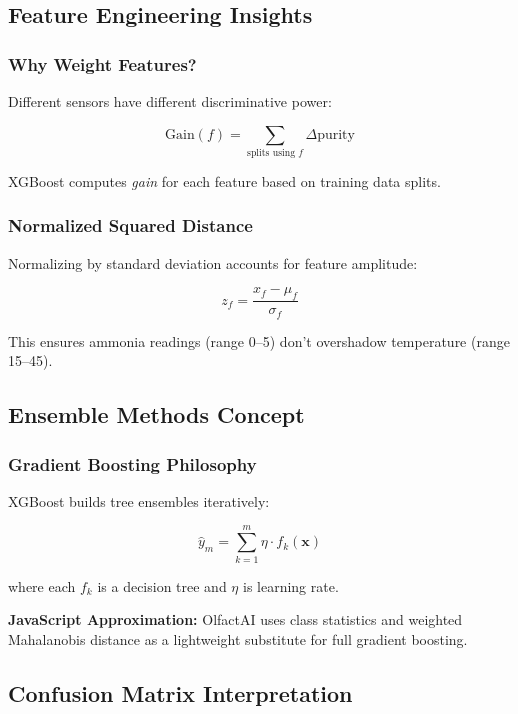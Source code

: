 \documentclass[10pt]{article}
\begin{document}
{\subsection{Feature Engineering Insights}

\subsubsection{Why Weight Features?}

Different sensors have different discriminative power:

\[
\text{Gain}(f) = \sum_{\text{splits using } f} \Delta \text{purity}
\]

XGBoost computes \textit{gain} for each feature based on training data splits.

\subsubsection{Normalized Squared Distance}

Normalizing by standard deviation accounts for feature amplitude:

\begin{equation}
z_{f} = \frac{x_f - \mu_f}{\sigma_f}
\end{equation}

This ensures ammonia readings (range 0–5) don't overshadow temperature (range 15–45).

\subsection{Ensemble Methods Concept}

\subsubsection{Gradient Boosting Philosophy}

XGBoost builds tree ensembles iteratively:

\begin{equation}
\hat{y}_m = \sum_{k=1}^{m} \eta \cdot f_k(\mathbf{x})
\end{equation}

where each $f_k$ is a decision tree and $\eta$ is learning rate.

\textbf{JavaScript Approximation:} OlfactAI uses class statistics and weighted Mahalanobis distance as a lightweight substitute for full gradient boosting.

\subsection{Confusion Matrix Interpretation}

}
\end{document}
